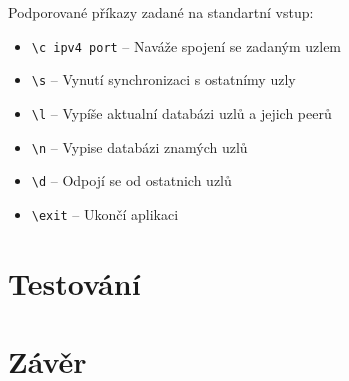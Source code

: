 \documentclass[11pt,a4paper,titlepage]{article}
\begin{document}
            Podporované příkazy zadané na standartní vstup:
            \begin{itemize}
                \item \verb+\c ipv4 port+ -- Naváže spojení se zadaným uzlem
                \item \verb+\s+ -- Vynutí synchronizaci s ostatnímy uzly
                \item \verb+\l+ -- Vypíše aktualní databázi uzlů a jejich peerů
                \item \verb+\n+ -- Vypise databázi znamých uzlů
                \item \verb+\d+ -- Odpojí se od ostatnich uzlů
                \item \verb+\exit+ -- Ukončí aplikaci
            \end{itemize}

    \section{Testování}
    \section{Závěr}
\end{document}
